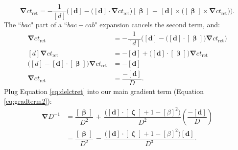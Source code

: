 \documentclass[12pt]{article}
\renewcommand{\vv}[1]{\mathbf{#1}}
\newcommand{\vvbeta}{\bm{\upbeta}}
\newcommand{\vvzeta}{\bm{\upzeta}}
\newcommand{\del}{\boldsymbol{\nabla}}
\begin{document}
\begin{equation*}
\del ct_{\mathrm{ret}} = - \dfrac{1}{[d]} \Big( [\vv d] - \big( [\vv d] \cdot \del ct_{\mathrm{ret}} \big) [\vvbeta] \, + \, [\vv d] \times \big( [\vvbeta] \times \del ct_{\mathrm{ret}} \big) \Big).
\end{equation*}
The ``$bac$" part of a ``$bac - cab$" expansion cancels the second term, and:
\begin{equation}\label{eq:delctret}
\begin{split}
\del ct_{\mathrm{ret}} &= - \dfrac{1}{[d]} \Big( [\vv d] - \big( [\vv d] \cdot [\vvbeta] \big) \del ct_{\mathrm{ret}} \Big) \\[3pt]
[d] \del ct_{\mathrm{ret}} &= - [\vv d] + \big( [\vv d] \cdot [\vvbeta] \big) \del ct_{\mathrm{ret}} \\[4pt]
\big( [d] - [\vv d] \cdot [\vvbeta] \big) \del ct_{\mathrm{ret}} &= - [\vv d] \\[3pt]
\del ct_{\mathrm{ret}} &= \dfrac{-[\vv d]}{D} .
\end{split}
\end{equation}
Plug Equation \ref{eq:delctret} into our main gradient term (Equation \ref{eq:gradterm2}):
\begin{equation}\label{eq:gradterm3}
\begin{split}
\del D^{-1} &= \dfrac{[\vvbeta]}{D^{2}} \, + \, \dfrac{\big( [\vv d] \cdot [\vvzeta] + 1 - [\beta]^2 \big)}{D^{2}} \left( \dfrac{- [\vv d]}{D} \right)  \\[5pt]
&= \dfrac{[\vvbeta] }{D^{2}} \, - \, \dfrac{\big( [\vv d] \cdot [\vvzeta] + 1 - [\beta]^2 \big) [\vv d] }{D^{3}} .
\end{split}
\end{equation}
\end{document}

